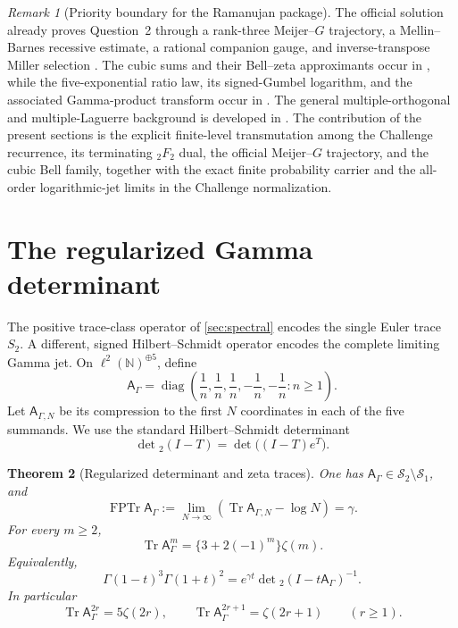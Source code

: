 \documentclass[11pt]{article}
\theoremstyle{keio}
\newtheorem{theorem}{Theorem}[section]
\theoremstyle{definition}
\theoremstyle{remark}
\newtheorem{remark}[theorem]{Remark}
\newcommand{\N}{\mathbb N}
\newcommand{\Tr}{\operatorname{Tr}}
\newcommand{\diag}{\operatorname{diag}}
\newcommand{\FPTr}{\operatorname{FPTr}}
\begin{document}
\begin{remark}[Priority boundary for the Ramanujan package]
The official solution already proves Question~2 through a rank-three
Meijer--\(G\) trajectory, a Mellin--Barnes recessive estimate, a rational
companion gauge, and inverse-transpose Miller selection
\cite{RamanujanOfficial2026}.  The cubic sums and their Bell--zeta
approximants occur in \cite{PilehroodBell2012,Pilehrood2013}, while the
five-exponential ratio law, its signed-Gumbel logarithm, and the associated
Gamma-product transform occur in \cite{Powers2023}.  The general
multiple-orthogonal and multiple-Laguerre background is developed in
\cite{VanAsscheWolfs2023,WolfsVanAssche2025}.  The contribution of the
present sections is the explicit finite-level transmutation among the
Challenge recurrence, its terminating \({}_2F_2\) dual, the official
Meijer--\(G\) trajectory, and the cubic Bell family, together with the exact
finite probability carrier and the all-order logarithmic-jet limits in the
Challenge normalization.
\end{remark}

\section{The regularized Gamma determinant}
\label{sec:gamma-determinant}

The positive trace-class operator of \cref{sec:spectral} encodes the single
Euler trace \(S_2\).  A different, signed Hilbert--Schmidt operator encodes
the complete limiting Gamma jet.  On
\(\ell^2(\N)^{\oplus5}\), define
\begin{equation}\label{eq:A-Gamma}
 \mathsf A_\Gamma=\diag\left(
 \frac1n,\frac1n,\frac1n,-\frac1n,-\frac1n:n\ge1\right).
\end{equation}
Let \(\mathsf A_{\Gamma,N}\) be its compression to the first \(N\)
coordinates in each of the five summands.  We use the standard
Hilbert--Schmidt determinant
\[
 \det{}_2(I-T)=\det\bigl((I-T)e^T\bigr).
\]

\begin{theorem}[Regularized determinant and zeta traces]
\label{thm:gamma-det2}
One has
\(\mathsf A_\Gamma\in\mathcal S_2\setminus\mathcal S_1\), and
\begin{equation}\label{eq:FP-trace-gamma}
 \boxed{\displaystyle
 \FPTr\mathsf A_\Gamma
 :=\lim_{N\to\infty}
 \left(\Tr\mathsf A_{\Gamma,N}-\log N\right)=\gamma.}
\end{equation}
For every \(m\ge2\),
\begin{equation}\label{eq:Gamma-operator-traces}
 \boxed{\displaystyle
 \Tr\mathsf A_\Gamma^m
 =\{3+2(-1)^m\}\zeta(m).}
\end{equation}
Equivalently,
\begin{equation}\label{eq:Gamma-det2}
 \boxed{\displaystyle
 \Gamma(1-t)^3\Gamma(1+t)^2
 =e^{\gamma t}\det{}_2(I-t\mathsf A_\Gamma)^{-1}.}
\end{equation}
In particular
\begin{equation}\label{eq:Gamma-even-odd-traces}
 \Tr\mathsf A_\Gamma^{2r}=5\zeta(2r),\qquad
 \Tr\mathsf A_\Gamma^{2r+1}=\zeta(2r+1)\qquad(r\ge1).
\end{equation}
\end{theorem}
\end{document}

